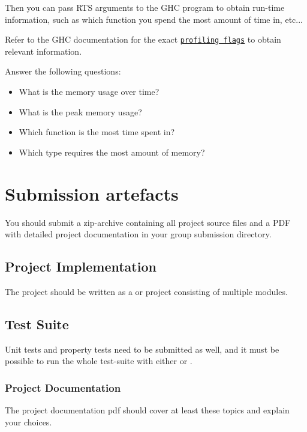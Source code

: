 \documentclass{article}
\begin{document}
Then you can pass RTS arguments to the GHC program to obtain run-time information, such as which function you spend the most amount of time in, etc...

Refer to the GHC documentation for the exact \href{https://downloads.haskell.org/ghc/latest/docs/html/users_guide/profiling.html#profiling-memory-usage}{\texttt{profiling flags}} to obtain relevant information.

Answer the following questions:

\begin{itemize}
\item What is the memory usage over time?
\item What is the peak memory usage?
\item Which function is the most time spent in?
\item Which type requires the most amount of memory?
\end{itemize}

\section{Submission artefacts}

You should submit a zip-archive containing all project source files and a PDF with detailed project documentation in your group submission directory.

\subsection{Project Implementation}

The project should be written as a  or  project consisting of multiple modules.

\subsection{Test Suite}

Unit tests and property tests need to be submitted as well, and it must be possible to run the whole test-suite with either  or .

\subsubsection{Project Documentation}

The project documentation pdf should cover at least these topics and explain your choices.
\end{document}
